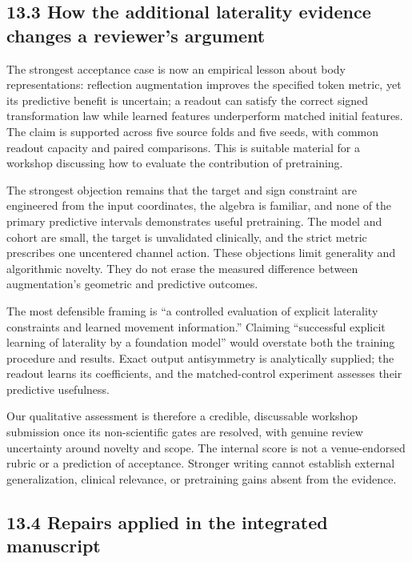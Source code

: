 \documentclass[11pt,letterpaper]{article}
\newcounter{none}
\begin{document}
\subsection{13.3 How the additional laterality evidence changes a
reviewer's
argument}\label{how-the-additional-laterality-evidence-changes-a-reviewers-argument}

The strongest acceptance case is now an empirical lesson about body
representations: reflection augmentation improves the specified token
metric, yet its predictive benefit is uncertain; a readout can satisfy
the correct signed transformation law while learned features
underperform matched initial features. The claim is supported across
five source folds and five seeds, with common readout capacity and
paired comparisons. This is suitable material for a workshop discussing
how to evaluate the contribution of pretraining.

The strongest objection remains that the target and sign constraint are
engineered from the input coordinates, the algebra is familiar, and none
of the primary predictive intervals demonstrates useful pretraining. The
model and cohort are small, the target is unvalidated clinically, and
the strict metric prescribes one uncentered channel action. These
objections limit generality and algorithmic novelty. They do not erase
the measured difference between augmentation's geometric and predictive
outcomes.

The most defensible framing is ``a controlled evaluation of explicit
laterality constraints and learned movement information.'' Claiming
``successful explicit learning of laterality by a foundation model''
would overstate both the training procedure and results. Exact output
antisymmetry is analytically supplied; the readout learns its
coefficients, and the matched-control experiment assesses their
predictive usefulness.

Our qualitative assessment is therefore a credible, discussable workshop
submission once its non-scientific gates are resolved, with genuine
review uncertainty around novelty and scope. The internal score is not a
venue-endorsed rubric or a prediction of acceptance. Stronger writing
cannot establish external generalization, clinical relevance, or
pretraining gains absent from the evidence.

\subsection{13.4 Repairs applied in the integrated
manuscript}\label{repairs-applied-in-the-integrated-manuscript}
\end{document}
